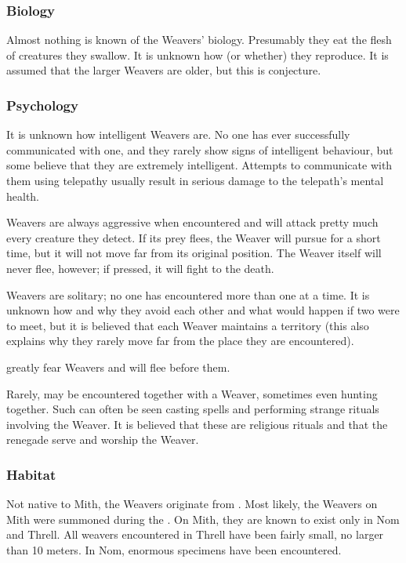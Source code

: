 \subsubsection{Biology}
Almost nothing is known of the Weavers' biology. Presumably they eat the flesh of creatures they swallow. It is unknown how (or whether) they reproduce. It is assumed that the larger Weavers are older, but this is conjecture. 

\subsubsection{Psychology}
It is unknown how intelligent Weavers are. No one has ever successfully communicated with one, and they rarely show signs of intelligent behaviour, but some believe that they are extremely intelligent. Attempts to communicate with them using telepathy usually result in serious damage to the telepath's mental health. 

Weavers are always aggressive when encountered and will attack pretty much every creature they detect. If its prey flees, the Weaver will pursue for a short time, but it will not move far from its original position. The Weaver itself will never flee, however; if pressed, it will fight to the death. 

Weavers are solitary; no one has encountered more than one at a time. It is unknown how and why they avoid each other and what would happen if two were to meet, but it is believed that each Weaver maintains a territory (this also explains why they rarely move far from the place they are encountered). 

\Banes{} greatly fear Weavers and will flee before them. 

Rarely, \banes{} may be encountered together with a Weaver, sometimes even hunting together. Such \banes{} can often be seen casting spells and performing strange rituals involving the Weaver. It is believed that these are religious rituals and that the renegade \banes{} serve and worship the Weaver. %

\subsubsection{Habitat}
Not native to Mith, the Weavers originate from \Erebos. Most likely, the Weavers on Mith were summoned during the \banewar. On Mith, they are known to exist only in Nom and Threll. All weavers encountered in Threll have been fairly small, no larger than 10 meters. In Nom, enormous specimens have been encountered. 

